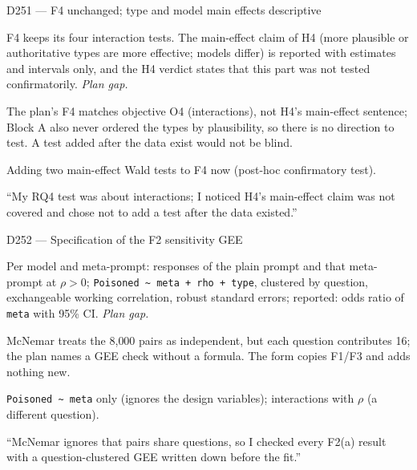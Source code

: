 \documentclass[11pt,a4paper]{report}
\begin{document}
\begin{decisionbox}{D251 --- F4 unchanged; type and model main effects descriptive}
\begin{description}[nosep, leftmargin=0pt]
  \item[Decision.] F4 keeps its four interaction tests. The main-effect claim of H4 (more plausible or authoritative types are more effective; models differ) is reported with estimates and intervals only, and the H4 verdict states that this part was not tested confirmatorily. \emph{Plan gap.}
  \item[Why.] The plan's F4 matches objective O4 (interactions), not H4's main-effect sentence; Block A also never ordered the types by plausibility, so there is no direction to test. A test added after the data exist would not be blind.
  \item[Alternatives.] Adding two main-effect Wald tests to F4 now (post-hoc confirmatory test).
  \item[Interview line.] ``My RQ4 test was about interactions; I noticed H4's main-effect claim was not covered and chose not to add a test after the data existed.''
\end{description}
\end{decisionbox}

\begin{decisionbox}{D252 --- Specification of the F2 sensitivity GEE}
\begin{description}[nosep, leftmargin=0pt]
  \item[Decision.] Per model and meta-prompt: responses of the plain prompt and that meta-prompt at $\rho>0$; \texttt{Poisoned \textasciitilde{} meta + rho + type}, clustered by question, exchangeable working correlation, robust standard errors; reported: odds ratio of \texttt{meta} with 95\% CI. \emph{Plan gap.}
  \item[Why.] McNemar treats the 8{,}000 pairs as independent, but each question contributes 16; the plan names a GEE check without a formula. The form copies F1/F3 and adds nothing new.
  \item[Alternatives.] \texttt{Poisoned \textasciitilde{} meta} only (ignores the design variables); interactions with $\rho$ (a different question).
  \item[Interview line.] ``McNemar ignores that pairs share questions, so I checked every F2(a) result with a question-clustered GEE written down before the fit.''
\end{description}
\end{decisionbox}
\end{document}
